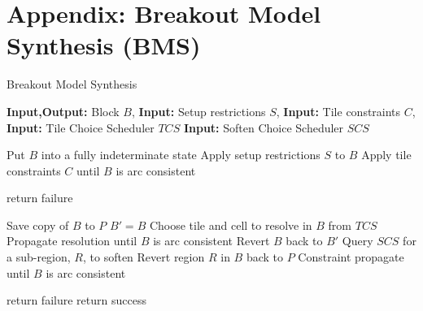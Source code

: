 

\section{Appendix: Breakout Model Synthesis (BMS)}

%

\begin{algorithm}[H]
  \caption{Breakout Model Synthesis}
  \label{alg:bms}
  \begin{algorithmic}
    \State \textbf{Input,Output:} Block $B$,
    \State \textbf{Input:} Setup restrictions $S$,
    \State \textbf{Input:} Tile constraints $C$,
    \State \textbf{Input:} Tile Choice Scheduler $TCS$
    \State \textbf{Input:} Soften Choice Scheduler $SCS$

		\State Put $B$ into a fully indeterminate state
		\State Apply setup restrictions $S$ to $B$
    \State Apply tile constraints $C$ until $B$ is arc consistent

			\State return failure
		\EndIf

		\State Save copy of $B$ to $P$
			\State $B' = B$
      \State Choose tile and cell to resolve in $B$ from $TCS$
      \State Propagate resolution until $B$ is arc consistent
				\State Revert $B$ back to $B'$
				\State Query $SCS$ for a sub-region, $R$, to soften
				\State Revert region $R$ in $B$ back to $P$
        \State Constraint propagate until $B$ is arc consistent
			\EndIf

        \State return failure
      \EndIf
    \EndWhile
    \State return success
  \end{algorithmic}
\end{algorithm}



